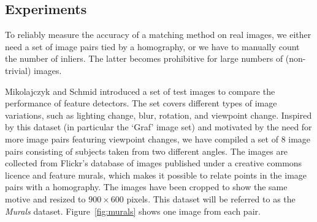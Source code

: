 \documentclass{article}
\begin{document}
%

\subsection{Experiments}
\label{S:Experiments}
%
To reliably measure the accuracy of a matching method on real images, we 
either need a set of image pairs tied by a homography, or we have to manually count 
the number of inliers. The latter becomes prohibitive for large numbers of (non-trivial) images. 

Mikolajczyk and Schmid  \cite{mikolajczyk2005performance} introduced a set of test images
to compare the performance of feature detectors. The 
set covers different types of image variations, such as lighting change, 
blur, rotation, and viewpoint change. Inspired by this 
dataset (in particular the `Graf' image set) and motivated by 
the need for more image pairs featuring viewpoint changes, we have 
compiled a set of 8 image pairs consisting of subjects taken from two 
different angles. The images are collected from Flickr's database of 
images published under a creative commons 
licence %
and feature murals, which 
makes it possible to relate points in the image pairs with a homography.  
The images have been cropped to show the same motive and resized to 
$900\times 600$ pixels.  This dataset will be referred to as the 
\emph{Murals} dataset.  Figure~\ref{fig:murals} shows one image from each pair.
\end{document}
